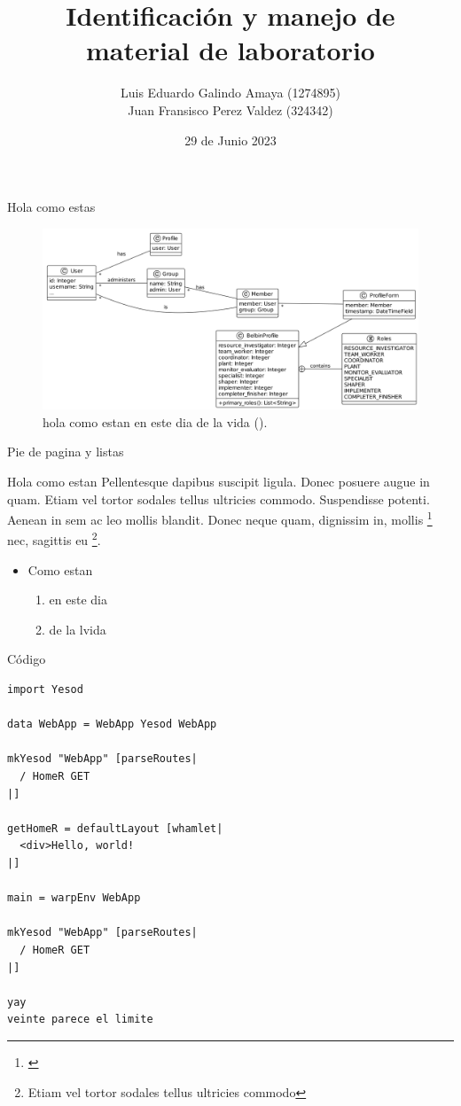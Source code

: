 \documentclass[aspectratio=169, 9pt]{beamer}
\author{Luis Eduardo Galindo Amaya (1274895) \\
Juan Fransisco Perez Valdez  (324342)}
\date{29 de Junio 2023}
\title{Identificación y manejo de \\
material de laboratorio}
\begin{document}
\maketitle

\begin{frame}[label={sec:org99c4775}]{Hola como estas}
\begin{figure}[htbp]
\centering
\includegraphics[width=.9\linewidth]{./images/dmulti.png}
\caption{hola como estan en este dia de la vida (\cite{einstein}).}
\end{figure}
\end{frame}

\begin{frame}[label={sec:orgbce1b32}]{Pie de pagina y listas}
\begin{block}{Hola como estan}
Pellentesque dapibus suscipit ligula.  Donec posuere augue in quam.  Etiam vel
tortor sodales tellus ultricies commodo.  Suspendisse potenti.  Aenean in sem 
ac leo mollis blandit.  Donec neque quam, dignissim in, mollis \footnote{\cite{russell}}
nec, sagittis eu \footnote{Etiam vel tortor sodales tellus ultricies commodo}. 

\begin{itemize}
\item Como estan
\begin{enumerate}
\item en este dia
\item de la lvida
\end{enumerate}
\end{itemize}
\end{block}
\end{frame}

\begin{frame}[label={sec:orgf4366d8},fragile]{Código}
 \begin{verbatim}
import Yesod

data WebApp = WebApp Yesod WebApp

mkYesod "WebApp" [parseRoutes|
  / HomeR GET
|]

getHomeR = defaultLayout [whamlet|
  <div>Hello, world!
|]

main = warpEnv WebApp

mkYesod "WebApp" [parseRoutes|
  / HomeR GET
|]

yay
veinte parece el limite
\end{verbatim}
\end{frame}
\end{document}
